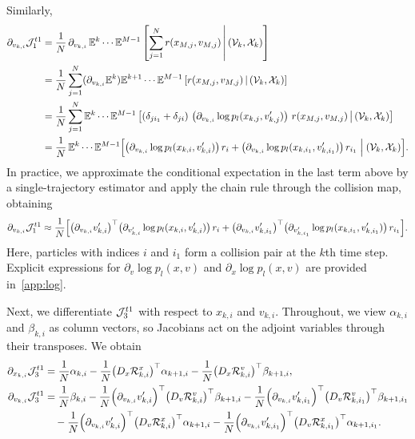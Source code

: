 \documentclass[12pt,nopreprintline]{elsarticle}
\begin{document}
Similarly,
\begin{align}
\partial_{v_{k,i}} \mathcal J_1^{t1}
&= \frac{1}{N}\,\partial_{v_{k,i}}\, \mathbb E^{k}\cdots \mathbb E^{M-1}
\left[ \sum_{j=1}^N r(x_{M,j}, v_{M,j}) \,\middle|\, (\mathcal V_{k}, \mathcal X_{k}) \right] \nonumber \\
&= \frac{1}{N} \sum^{N}_{j=1}(\partial_{v_{k,i}}\mathbb E^{k}) \mathbb E^{k+1}\cdots \mathbb E^{M-1}
\left[r(x_{M,j}, v_{M,j}) \,\middle|\, (\mathcal V_k,\mathcal X_k)\right] \nonumber \\
&= \frac{1}{N} \sum^{N}_{j=1}\mathbb E^{k}\cdots \mathbb E^{M-1}
\left[  \left(  \delta_{j i_1} + \delta_{j i} \right)\,
\left( \partial_{v_{k,i}} \log p_l(x_{k,j}, v'_{k,j})  \right)\,
r(x_{M,j}, v_{M,j})
\,\middle|\, (\mathcal V_k,\mathcal X_k) \right]  \nonumber \\
&= \frac{1}{N}\,\mathbb E^{k}\cdots \mathbb E^{M-1}
\Bigl[
\bigl(\partial_{v_{k,i}} \log p_l(x_{k,i}, v'_{k,i})\bigr)\, r_i
+
\bigl(\partial_{v_{k,i}} \log p_l(x_{k,i_1}, v'_{k,i_1})\bigr)\, r_{i_1}
\Bigm| (\mathcal V_k,\mathcal X_k)
\Bigr]. \nonumber
\end{align}
In practice, we approximate the conditional expectation in the last term above by a single-trajectory estimator and apply the chain rule through the collision map, obtaining
\begin{align}
\partial_{v_{k,i}} \mathcal J_1^{t1}
\approx \frac{1}{N}\Bigl[
\bigl(\partial_{v_{k,i}} v'_{k,i}\bigr)^{\top}
\bigl(\partial_{v'_{k,i}} \log p_l(x_{k,i}, v'_{k,i})\bigr)\, r_i
+
\bigl(\partial_{v_{k,i}} v'_{k,i_1}\bigr)^{\top}
\bigl(\partial_{v'_{k,i_1}} \log p_l(x_{k,i_1}, v'_{k,i_1})\bigr)\, r_{i_1}
\Bigr]. \label{eq:J_final_t1_v}
\end{align}
Here, particles with indices $i$ and $i_1$ form a collision pair at the $k$th time step. Explicit expressions for $\partial_v \log p_l(x,v)$ and $\partial_x \log p_l(x,v)$ are provided in~\ref{app:log}.

Next, we differentiate $\mathcal J_{3}^{t1}$ with respect to $x_{k,i}$ and $v_{k,i}$. Throughout, we view $\alpha_{k,i}$ and $\beta_{k,i}$ as column vectors, so Jacobians act on the adjoint variables through their transposes. We obtain
\begin{align}
\partial_{x_{k,i}} \mathcal J_{3}^{t1}
&= \frac{1}{N}\alpha_{k,i}
-\frac{1}{N}\bigl(D_x \mathcal{R}^x_{k,i}\bigr)^{\top}\alpha_{k+1,i}
-\frac{1}{N}\bigl(D_x \mathcal{R}^v_{k,i}\bigr)^{\top}\beta_{k+1,i},
\label{eq:dJ3_dx}
\\
\partial_{v_{k,i}} \mathcal J_{3}^{t1}
&= \frac{1}{N}\beta_{k,i}
-\frac{1}{N}\Bigl(\partial_{v_{k,i}} v'_{k,i}\Bigr)^{\top}\bigl(D_v \mathcal{R}^v_{k,i}\bigr)^{\top}\beta_{k+1,i}
-\frac{1}{N}\Bigl(\partial_{v_{k,i}} v'_{k,i_1}\Bigr)^{\top}\bigl(D_v \mathcal{R}^v_{k,i_1}\bigr)^{\top}\beta_{k+1,i_1}
\nonumber\\
&\quad
-\frac{1}{N}\Bigl(\partial_{v_{k,i}} v'_{k,i}\Bigr)^{\top}\bigl(D_v \mathcal{R}^x_{k,i}\bigr)^{\top}\alpha_{k+1,i}
-\frac{1}{N}\Bigl(\partial_{v_{k,i}} v'_{k,i_1}\Bigr)^{\top}\bigl(D_v \mathcal{R}^x_{k,i_1}\bigr)^{\top}\alpha_{k+1,i_1}.
\label{eq:dJ3_dv}
\end{align}
\end{document}
